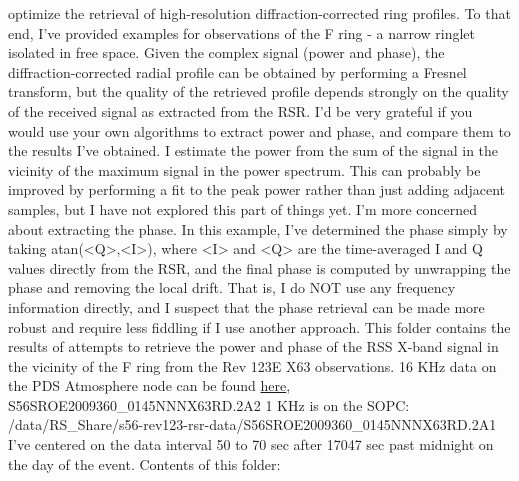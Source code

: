 \documentclass[crop=false,class=article,oneside]{standalone}
\begin{document}
optimize the retrieval of high-resolution diffraction-corrected ring
profiles. To that end, I've provided examples for observations of the
F ring - a narrow ringlet isolated in free space. Given the complex
signal (power and phase), the diffraction-corrected radial profile can
be obtained by performing a Fresnel transform, but the quality of the
retrieved profile depends strongly on the quality of the received
signal as extracted from the RSR. I'd be very grateful if you would
use your own algorithms to extract power and phase, and compare them
to the results I've obtained. I estimate the power from the sum of the
signal in the vicinity of the maximum signal in the power spectrum.
This can probably be improved by performing a fit to the peak power
rather than just adding adjacent samples, but I have not explored this
part of things yet. I'm more concerned about extracting the phase. In
this example, I've determined the phase simply by taking
atan(<Q>,<I>), where <I> and <Q> are the time-averaged I and Q values
directly from the RSR, and the final phase is computed by unwrapping
the phase and removing the local drift. That is, I do NOT use any
frequency information directly, and I suspect that the phase retrieval
can be made more robust and require less fiddling if I use another
approach. This folder contains the results of attempts to retrieve the
power and phase of the RSS X-band signal in the vicinity of the F ring
from the Rev 123E X63 observations. 16 KHz data on the PDS Atmosphere
node can be found \href{https://pds-atmospheres.nmsu.edu/cgi-bin/getd
ir.pl?volume=cors_0302&dir=SROC10_359/RSR}{here},
S56SROE2009360\_0145NNNX63RD.2A2
1 KHz is on the SOPC:
/data/RS\_Share/s56-rev123-rsr-data/S56SROE2009360\_0145NNNX63RD.2A1
I've centered on the data interval 50 to 70 sec after 17047 sec past
midnight on the day of the event. Contents of this folder:
\end{document}
